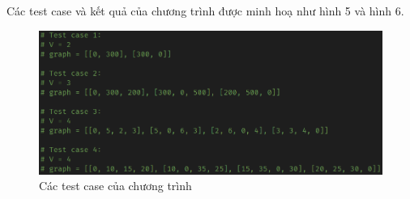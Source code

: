 \documentclass[a4paper, 11pt]{article}
\begin{document}
Các test case và kết quả của chương trình được minh hoạ như hình 5 và hình 6.

\begin{figure}[h]
  \centering
  \includegraphics[width=\textwidth, height=\textheight,keepaspectratio]{test_cases.png}
  \caption{Các test case của chương trình}
\end{figure}
\end{document}

